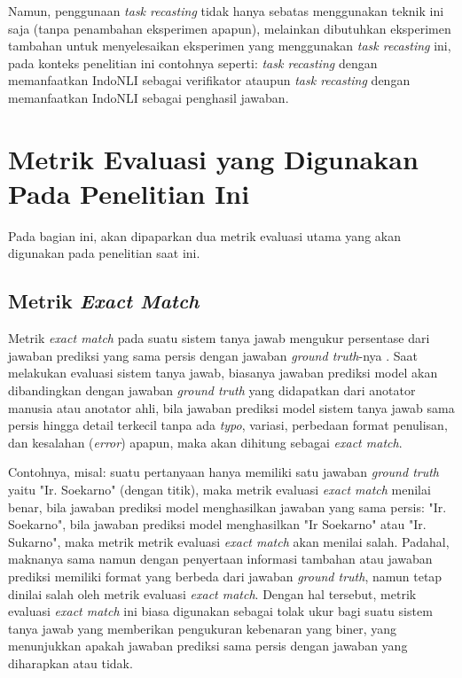 Namun, penggunaan \emph{task recasting} tidak hanya sebatas menggunakan teknik ini saja (tanpa penambahan eksperimen apapun), melainkan dibutuhkan eksperimen tambahan untuk menyelesaikan eksperimen yang menggunakan \emph{task recasting} ini, pada konteks penelitian ini contohnya seperti: \emph{task recasting} dengan memanfaatkan IndoNLI sebagai verifikator ataupun \emph{task recasting} dengan memanfaatkan IndoNLI sebagai penghasil jawaban.

\section{Metrik Evaluasi yang Digunakan Pada Penelitian Ini}
Pada bagian ini, akan dipaparkan dua metrik evaluasi utama yang akan digunakan
pada penelitian saat ini.

\subsection{Metrik \emph{Exact Match}}
Metrik \emph{exact match} pada suatu sistem tanya jawab mengukur persentase dari jawaban prediksi yang sama persis dengan jawaban \emph{ground truth}-nya \citep{rajpurkar-etal-2016-squad}. Saat melakukan evaluasi sistem tanya jawab, biasanya jawaban prediksi model akan dibandingkan dengan jawaban \emph{ground truth} yang didapatkan dari anotator manusia atau anotator ahli, bila jawaban prediksi model sistem tanya jawab sama persis hingga detail terkecil tanpa ada \emph{typo}, variasi, perbedaan format penulisan, dan kesalahan (\emph{error}) apapun, maka akan dihitung sebagai \emph{exact match}.

Contohnya, misal: suatu pertanyaan hanya memiliki satu jawaban \emph{ground truth} yaitu "Ir. Soekarno" (dengan titik), maka metrik evaluasi \emph{exact match} menilai benar, bila jawaban prediksi model menghasilkan jawaban yang sama persis: "Ir. Soekarno", bila jawaban prediksi model menghasilkan "Ir Soekarno" atau "Ir. Sukarno", maka metrik metrik evaluasi \emph{exact match} akan menilai salah. Padahal, maknanya sama namun dengan penyertaan informasi tambahan atau jawaban prediksi memiliki format yang berbeda dari jawaban \emph{ground truth}, namun tetap dinilai salah oleh metrik evaluasi \emph{exact match}. Dengan hal tersebut, metrik evaluasi \emph{exact match} ini biasa digunakan sebagai tolak ukur bagi suatu sistem tanya jawab yang memberikan pengukuran kebenaran yang biner, yang menunjukkan apakah jawaban prediksi sama persis dengan jawaban yang diharapkan atau tidak.

